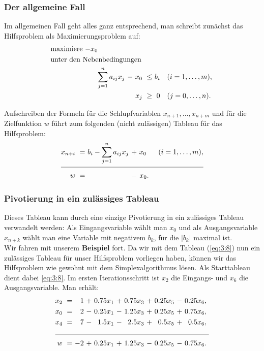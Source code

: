 \documentclass[smaller]{beamer}
\begin{document}
\begin{frame}
 \frametitle{Der allgemeine Fall}
 Im allgemeinen Fall geht alles ganz entsprechend, man schreibt zunächst das Hilfsproblem als Maximierungsproblem auf:
\begin{align*}
\begin{alignedat}{5}
& \text{maximiere $-x_0$} & & & & & & \\
& \rlap{unter den Nebenbedingungen} & & & & & & \\
&& \sum\limits_{j=1}^{n}{a_{ij}x_j} &\ - &\ x_0 &\ \leq &\ b_i & \quad (i=1,\ldots,m), \\
&&                                  &    &\ x_j &\ \geq &\   0 & \quad (j=0,\ldots,n).\
\end{alignedat}
\end{align*}

Aufschreiben der Formeln für die Schlupfvariablen $x_{n+1},\ldots,x_{n+m}$ und für die Zielfunktion $w$ führt zum folgenden (nicht zulässigen) Tableau für das Hilfsproblem:
\begin{align*}
\begin{alignedat}{6}
x_{n+i} &\ = &\  b_i - \sum\limits_{j=1}^{n}{a_{ij}x_j} &\ + &\ x_0\ &\ \quad (i=1,\ldots,m), \\ \cline{1-6}
     w  &\ = &\                                         &\ - &\ x_0. &
\end{alignedat}
\end{align*}
\end{frame}

\begin{frame}
 \frametitle{Pivotierung in ein zulässiges Tableau}
 \alert{Dieses Tableau kann durch eine einzige Pivotierung in ein zulässiges Tableau verwandelt werden}: Als Eingangsvariable wählt man $x_0$ und als Ausgangsvariable $x_{n+k}$ wählt man eine Variable mit negativem $b_k$, für die $|b_k|$ maximal ist. \\
\vspace*{0.2cm}
Wir fahren mit unserem \textbf{Beispiel} fort. Da wir mit dem Tableau (\ref{eq:3:8}) nun ein \alert{zulässiges} Tableau für unser Hilfsproblem vorliegen haben, können wir das Hilfsproblem wie gewohnt mit dem Simplexalgorithmus lösen. Als Starttableau dient dabei \eqref{eq:3:8}. Im ersten Iterationsschritt ist $x_2$ die Eingangs- und $x_6$ die Ausgangsvariable. Man erhält:
\begin{align*}
\begin{alignedat}{6}
x_2 &\ = &\  1 &\ + &\ 0.75x_1 &\ + &\ 0.75x_3 &\ + &\ 0.25x_5 &\ - &\ 0.25x_6,\ \\
x_0 &\ = &\  2 &\ - &\ 0.25x_1 &\ - &\ 1.25x_3 &\ + &\ 0.25x_5 &\ + &\ 0.75x_6,\ \\
x_4 &\ = &\  7 &\ - &\  1.5x_1 &\ - &\  2.5x_3 &\ + &\  0.5x_5 &\ + &\  0.5x_6,\ \\ \cline{1-11}
w   &\ = &\ -2 &\ + &\ 0.25x_1 &\ + &\ 1.25x_3 &\ - &\ 0.25x_5 &\ - &\ 0.75x_6.\
\end{alignedat}
\end{align*}\label{page:3:3}
\end{frame}
\end{document}
